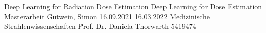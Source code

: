 \documentclass[12pt, oneside]{article}
\begin{document}
\titlespacing{\section}{0pt}{0pt}{0pt}
\titlespacing{\subsection}{0pt}{6pt}{0pt}
\titlespacing{\subsubsection}{0pt}{6pt}{0pt}

\Titlepage
    {Deep Learning for Radiation Dose Estimation}   %
    {Deep Learning for Dose Estimation}             %
    {Masterarbeit}                                  %
    {Gutwein, Simon}                                %
    {16.09.2021}                                    %
    {16.03.2022}                                    %
    {Medizinische Strahlenwissenschaften}           %
    {Prof. Dr. Daniela Thorwarth}                   %
    {5419474}                                       %


\newpage
{}

\Abstract

\tableofcontents


\newpage

\listoffigures
{}%



\newpage

%
\listoftables
\end{document}
